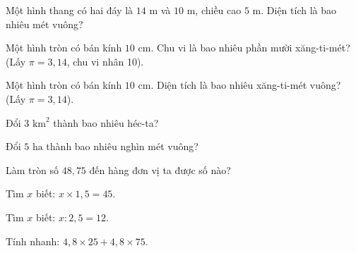 \begin{ex}
  Một hình thang có hai đáy là $14\text{ m}$ và $10\text{ m}$, chiều cao $5\text{ m}$. Diện tích là bao nhiêu mét vuông?
\end{ex}

\begin{ex}
  Một hình tròn có bán kính $10\text{ cm}$. Chu vi là bao nhiêu phần mười xăng-ti-mét? (Lấy $\pi = 3{,}14$, chu vi nhân 10).
\end{ex}

\begin{ex}
  Một hình tròn có bán kính $10\text{ cm}$. Diện tích là bao nhiêu xăng-ti-mét vuông? (Lấy $\pi = 3{,}14$).
\end{ex}

\begin{ex}
  Đổi $3\text{ km}^2$ thành bao nhiêu héc-ta?
\end{ex}

\begin{ex}
  Đổi $5\text{ ha}$ thành bao nhiêu nghìn mét vuông?
\end{ex}

\begin{ex}
  Làm tròn số $48{,}75$ đến hàng đơn vị ta được số nào?
\end{ex}

\begin{ex}
  Tìm $x$ biết: $x \times 1{,}5 = 45$.
\end{ex}

\begin{ex}
  Tìm $x$ biết: $x : 2{,}5 = 12$.
\end{ex}

\begin{ex}
  Tính nhanh: $4{,}8 \times 25 + 4{,}8 \times 75$.
\end{ex}

